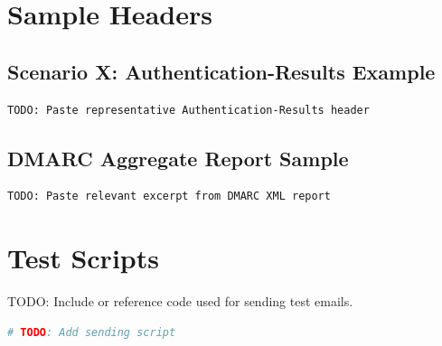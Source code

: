 \documentclass[11pt,a4paper]{article}
\begin{document}
\appendix
\section{Sample Headers}

\subsection{Scenario X: Authentication-Results Example}

\begin{lstlisting}
TODO: Paste representative Authentication-Results header
\end{lstlisting}

\subsection{DMARC Aggregate Report Sample}

\begin{lstlisting}
TODO: Paste relevant excerpt from DMARC XML report
\end{lstlisting}

\section{Test Scripts}

TODO: Include or reference code used for sending test emails.

\begin{lstlisting}[language=Python]
# TODO: Add sending script
\end{lstlisting}
\end{document}
